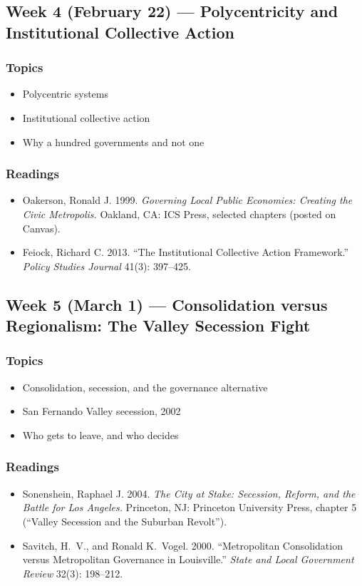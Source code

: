 \documentclass[12pt]{article}
\begin{document}
\subsection*{Week 4 (February 22) --- Polycentricity and Institutional Collective Action}
    \subsubsection*{Topics}
        \begin{itemize}
            \item Polycentric systems
            \item Institutional collective action
            \item Why a hundred governments and not one
        \end{itemize}
    \subsubsection*{Readings}
        \begin{itemize}
            \item Oakerson, Ronald J. 1999. \emph{Governing Local Public Economies: Creating the Civic Metropolis.} Oakland, CA: ICS Press, selected chapters (posted on Canvas).
            \item Feiock, Richard C. 2013. ``The Institutional Collective Action Framework.'' \emph{Policy Studies Journal} 41(3): 397--425.
        \end{itemize}

\subsection*{Week 5 (March 1) --- Consolidation versus Regionalism: The Valley Secession Fight}
    \subsubsection*{Topics}
        \begin{itemize}
            \item Consolidation, secession, and the governance alternative
            \item San Fernando Valley secession, 2002
            \item Who gets to leave, and who decides
        \end{itemize}
    \subsubsection*{Readings}
        \begin{itemize}
            \item Sonenshein, Raphael J. 2004. \emph{The City at Stake: Secession, Reform, and the Battle for Los Angeles.} Princeton, NJ: Princeton University Press, chapter 5 (``Valley Secession and the Suburban Revolt'').
            \item Savitch, H.\ V., and Ronald K.\ Vogel. 2000. ``Metropolitan Consolidation versus Metropolitan Governance in Louisville.'' \emph{State and Local Government Review} 32(3): 198--212.
        \end{itemize}
\end{document}
